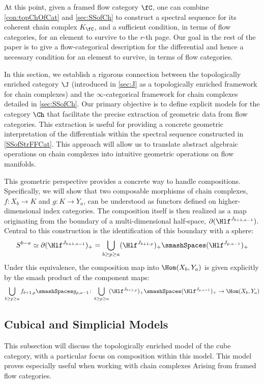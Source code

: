At this point, given a framed flow category $\fC$, one can combine \cref{con:topChOfCat} and \cref{sec:SSofCh} to construct a spectral sequence for its coherent chain complex $K_{\fC}$, and a sufficient condition, in terms of flow categories, for an element to survive to the $r$-th page. Our goal in the rest of the paper is to give a flow-categorical description for the differential and hence a necessary condition for an element to survive, in terms of flow categories.

In this section, we establish a rigorous connection between the topologically enriched category $\J$ (introduced in \cref{sec:J} as a topologically enriched framework for chain complexes) and the $\infty$-categorical framework for chain complexes detailed in \cref{sec:SSofCh}. Our primary objective is to define explicit models for the category $\Ch$ that facilitate the precise extraction of geometric data from flow categories. This extraction is useful for providing a concrete geometric interpretation of the differentials within the spectral sequence constructed in \cref{SSofStrFFCat}. This approach will allow us to translate abstract algebraic operations on chain complexes into intuitive geometric operations on flow manifolds.

This geometric perspective provides a concrete way to handle compositions. Specifically, we will show that two composable morphisms of chain complexes, $f\colon X_b \to K$ and $g\colon K \to Y_a$, can be understood as functors defined on higher-dimensional index categories. The composition itself is then realized as a map originating from the boundary of a multi-dimensional half-space, $\partial (\Hlf^{J_{b+1,a-1}})$. Central to this construction is the identification of this boundary with a sphere:
\begin{equation*}
    S^{b-a} \simeq \partial (\Hlf^{J_{b+1,a-1}})_+ = \bigcup_{b \geq p\geq a} (\Hlf^{J_{b+1,p}})_+ \smashSpaces (\Hlf^{J_{p,a-1}})_+
\end{equation*}
Under this equivalence, the composition map into $\Hom(X_b, Y_a)$ is given explicitly by the smash product of the component maps:
\begin{equation*}
    \bigcup_{b \geq p\geq a} f_{b+1,p}\smashSpaces g_{p,a-1} \colon \bigcup_{b \geq p\geq a} (\Hlf^{J_{b+1,p}})_+ \smashSpaces (\Hlf^{J_{p,a-1}})_+ \to \Hom(X_b,Y_a)
\end{equation*}





\subsection{Cubical and Simplicial Models}
This subsection will discuss the topologically enriched model of the cube category, with a particular focus on composition within this model. This model proves especially useful when working with chain complexes Arising from framed flow categories.

